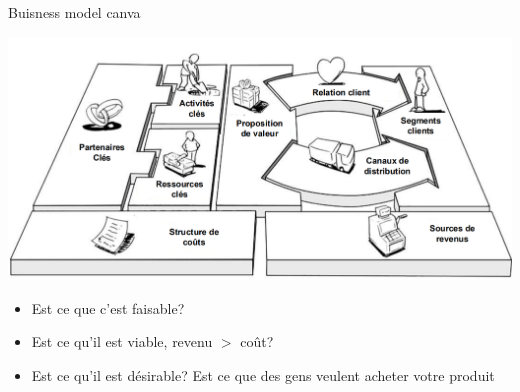 \begin{parag}{Buisness model canva}
	\begin{center}
    \includegraphics[scale=0.2]{82025-09-23.png}
	\end{center}
	
    \begin{itemize}
	    \item Est ce que c'est faisable?
	    \item Est ce qu'il est viable, revenu $>$ coût?
	    \item Est ce qu'il est désirable? Est ce que des gens veulent acheter votre produit
    \end{itemize}
    
\end{parag}


